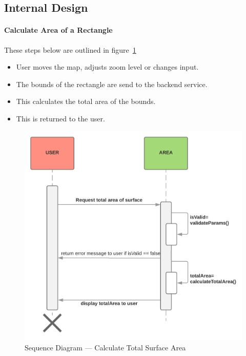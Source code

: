 \documentclass[a4paper,11pt]{article}
\begin{document}
\subsection{Internal Design}


\paragraph{Calculate Area of a Rectangle}

These steps below are outlined in figure~\ref{fig:seq-total-area}

\begin{itemize}
  \item User moves the map, adjusts zoom level or changes input.
  \item The bounds of the rectangle are send to the backend service.
  \item This calculates the total area of the bounds.
  \item This is returned to the user.
\end{itemize}

\begin{figure}[H]
  \includegraphics[width=\textwidth]{sequence-diagram-calculate-total-surface-area}
  \caption{Sequence Diagram --- Calculate Total Surface
  Area}\label{fig:seq-total-area}
\end{figure}
\end{document}
